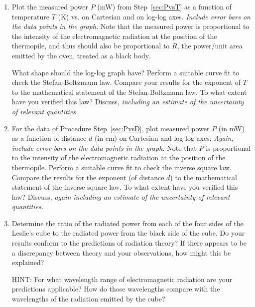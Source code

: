 \documentclass{article}
\begin{document}
\begin {enumerate}


\item Plot the measured power $P$ (mW) from Step~\ref{sec:PvsT} as a function of
temperature $T$ (K) vs. on Cartesian and on log-log axes. {\em Include error bars on the data points in the graph.} Note that the measured power is proportional to the intensity of the electromagnetic radiation at the position of the thermopile, and thus should also be proportional to $R$, the power/unit area emitted by the oven, treated as a black body. 

What shape should the log-log graph have?  Perform a suitable curve fit
to check the Stefan-Boltzmann law.  Compare your results for the
exponent of $T$ to the mathematical statement of the Stefan-Boltzmann
law.  To what extent have you verified this law?  Discuss, {\em including an estimate of the uncertainty of relevant quantities.}


\item For the data of Procedure Step~\ref{sec:PvsD}, plot measured power $P$ (in mW) as
a function of distance $d$ (in cm) on Cartesian and log-log axes.  {\em Again, include error bars on the data points in the graph.}  Note
that $P$ is proportional to the intensity of the electromagnetic
radiation at the position of the thermopile.  Perform a suitable curve
fit to check the inverse square law.  Compare the results for the
exponent (of distance $d$) to the mathematical statement of the inverse
square law. To what extent have you verified this law?  Discuss, {\em again including an estimate of the uncertainty of relevant quantities.}



\item Determine the ratio of the radiated power from each of the four
sides of the Leslie's cube to the radiated power from
the black side of the cube.  Do your results conform to the
predictions of radiation theory?  If there appears to be a discrepancy
between theory and your observations, how might this be explained? 

HINT: For what wavelength range of electromagnetic radiation are your
predictions applicable?  How do those wavelengths compare with the
wavelengths of the radiation emitted by the cube? 

\end{enumerate}
\end{document}
